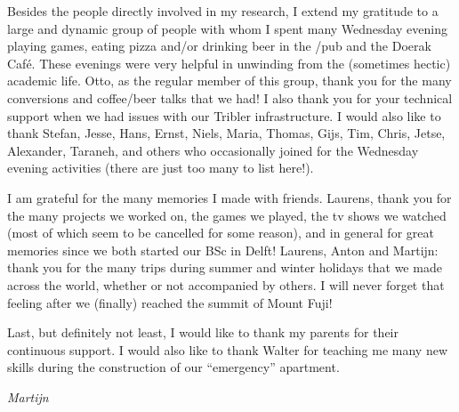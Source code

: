 Besides the people directly involved in my research, I extend my gratitude to a large and dynamic group of people with whom I spent many Wednesday evening playing games, eating pizza and/or drinking beer in the /pub and the Doerak Café.
These evenings were very helpful in unwinding from the (sometimes hectic) academic life.
Otto, as the regular member of this group, thank you for the many conversions and coffee/beer talks that we had!
I also thank you for your technical support when we had issues with our Tribler infrastructure.
I would also like to thank Stefan, Jesse, Hans, Ernst, Niels, Maria, Thomas, Gijs, Tim, Chris, Jetse, Alexander, Taraneh, and others who occasionally joined for the Wednesday evening activities (there are just too many to list here!).

I am grateful for the many memories I made with friends.
Laurens, thank you for the many projects we worked on, the games we played, the tv shows we watched (most of which seem to be cancelled for some reason), and in general for great memories since we both started our BSc in Delft!
Laurens, Anton and Martijn: thank you for the many trips during summer and winter holidays that we made across the world, whether or not accompanied by others.
I will never forget that feeling after we (finally) reached the summit of Mount Fuji!\emojifuji{}

Last, but definitely not least, I would like to thank my parents for their continuous support.
I would also like to thank Walter for teaching me many new skills during the construction of our \enquote{emergency} apartment.

\begin{flushright}
{\makeatletter\itshape
    Martijn
\makeatother}
\end{flushright}
